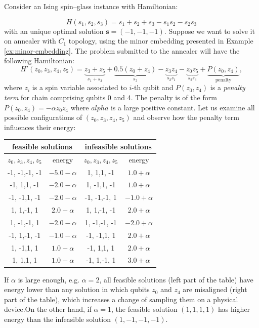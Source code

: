 \begin{example}
Consider an Ising spin--glass instance with Hamiltonian:

\begin{equation}
H(s_1, s_2, s_3) = s_1 + s_2 + s_3 - s_1s_2 - s_2s_3
\end{equation}
with an unique optimal solution $\mathbf{s} = (-1, -1, -1)$. Suppose we want to solve it on annealer
with $C_1$ topology, using the minor embedding presented in Example \ref{ex:minor-embedding}. The
problem submitted to the annealer will have the following Hamiltonian:
\begin{equation}
H'(z_0, z_3, z_4, z_5) = \underbrace{z_3 + z_5}_{s_1 + s_3} + \underbrace{0.5(z_0 + z_4)}_{s_2} - \underbrace{z_3z_4}_{s_2s_1} - \underbrace{z_0z_5}_{s_2s_3} + \underbrace{P(z_0, z_4)}_{\text{penalty}},
\end{equation}
where $z_i$ is a spin variable associated to $i$-th qubit and $P(z_0, z_4)$ is a \emph{penalty term}
for chain comprising qubits 0 and 4. The penalty is of the form $P(z_0, z_4) = -\alpha z_0z_4$ where
$alpha$ is a large positive constant. Let us examine all possible configurations of $(z_0, z_3, z_4,
z_5)$ and observe how the penalty term influences their energy:

\begin{center}
\begin{tabular}{|c|c|c|c|}
\hline
\multicolumn{2}{|c|}{feasible solutions} & \multicolumn{2}{c|}{infeasible solutions} \\
\hline
$z_0, z_3, z_4, z_5$ & energy & $z_0, z_3, z_4, z_5$ & energy\\
\hline
-1, -1,-1, -1 & $-5.0 -\alpha$ & 1, 1,1, -1 & $1.0 + \alpha$\\
-1, 1,1, -1 & $-2.0 -\alpha$ & 1, -1,1, -1 & $1.0 + \alpha$\\
-1, -1,1, -1 & $-2.0 -\alpha$ &-1, -1,-1, 1 & $-1.0 + \alpha$ \\
1, 1,-1, 1 & $2.0 -\alpha$ & 1, 1,-1, -1 & $2.0 + \alpha$ \\
1, -1,-1, 1 & $-2.0 -\alpha$ & 1, -1,-1, -1 & $-2.0 + \alpha$ \\
-1, 1,-1, -1 & $-1.0 -\alpha$ & -1, -1,1, 1 & $2.0 + \alpha$ \\
1, -1,1, 1 & $1.0 -\alpha$ & -1, 1,1, 1 & $2.0 + \alpha$\\
1, 1,1, 1 & $1.0  -\alpha$ & -1, 1,-1, 1 & $3.0 + \alpha$\\
\hline
\end{tabular}
\end{center}

If $\alpha$ is large enough, e.g. $\alpha=2$, all feasible solutions (left part of the table) have
energy lower than any solution in which qubits $z_0$ and $z_4$ are misaligned (right part of the
table), which increases a change of sampling them on a physical device.On the other hand, if
$\alpha=1$, the feasible solution $(1,1,1,1)$ has higher energy than the infeasible solution $(1,
-1, -1, -1)$.
\end{example}

